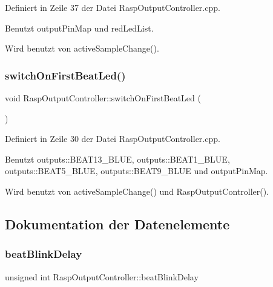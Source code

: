 Definiert in Zeile 37 der Datei Rasp\+Output\+Controller.\+cpp.



Benutzt output\+Pin\+Map und red\+Led\+List.



Wird benutzt von active\+Sample\+Change().

\mbox{\label{class_rasp_output_controller_a0cacbc3cbca8f1b78318234c6b74e576}} 
\subsubsection{\texorpdfstring{switch\+On\+First\+Beat\+Led()}{switchOnFirstBeatLed()}}
{\footnotesize\ttfamily void Rasp\+Output\+Controller\+::switch\+On\+First\+Beat\+Led (\begin{DoxyParamCaption}{ }\end{DoxyParamCaption})\hspace{0.3cm}{\ttfamily [private]}}



Definiert in Zeile 30 der Datei Rasp\+Output\+Controller.\+cpp.



Benutzt outputs\+::\+B\+E\+A\+T13\+\_\+\+B\+L\+UE, outputs\+::\+B\+E\+A\+T1\+\_\+\+B\+L\+UE, outputs\+::\+B\+E\+A\+T5\+\_\+\+B\+L\+UE, outputs\+::\+B\+E\+A\+T9\+\_\+\+B\+L\+UE und output\+Pin\+Map.



Wird benutzt von active\+Sample\+Change() und Rasp\+Output\+Controller().



\subsection{Dokumentation der Datenelemente}
\mbox{\label{class_rasp_output_controller_a4deb199f7d611c2be39dc2d59ea45bba}} 
\subsubsection{\texorpdfstring{beat\+Blink\+Delay}{beatBlinkDelay}}
{\footnotesize\ttfamily unsigned int Rasp\+Output\+Controller\+::beat\+Blink\+Delay\hspace{0.3cm}{\ttfamily [private]}}



